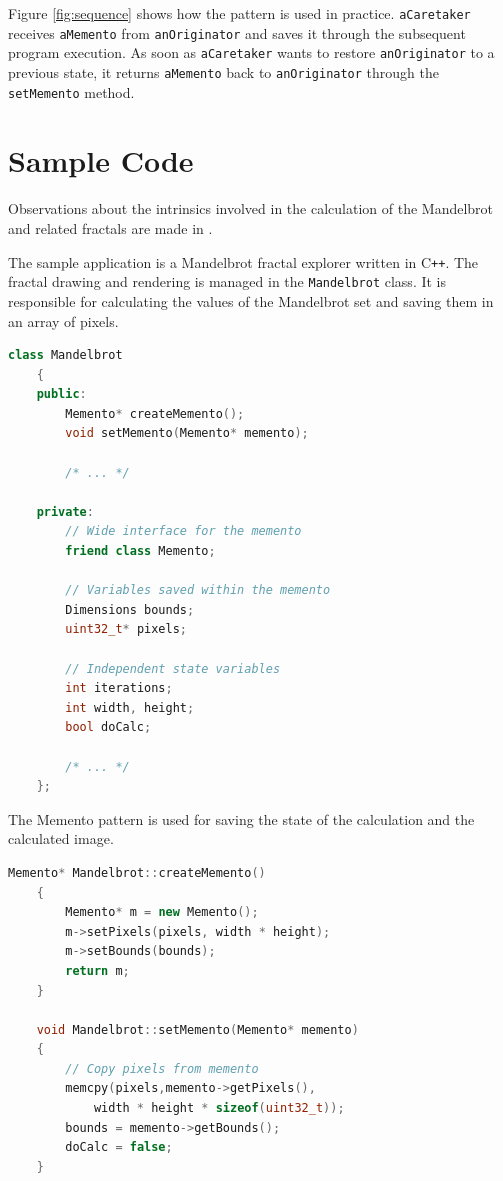 \documentclass[11pt, a4paper, twoside]{article}
\def\cpp{C{}\texttt{++}}
\begin{document}
	Figure \ref{fig:sequence} shows how the pattern is used in practice. \verb|aCaretaker| receives \verb|aMemento| from \verb|anOriginator| and saves it through the subsequent program execution. As soon as \verb|aCaretaker| wants to restore \verb|anOriginator| to a previous state, it returns \verb|aMemento| back to \verb|anOriginator| through the \verb|setMemento| method.
	
	
	\section{Sample Code}
	Observations about the intrinsics involved in the calculation of the Mandelbrot and related fractals are made in \cite{mandelbrot1980fractal}.
	
	The sample application is a Mandelbrot  fractal explorer written in \cpp. The fractal drawing and rendering is managed in the \verb|Mandelbrot| class. It is responsible for calculating the values of the Mandelbrot set and saving them in an array of pixels.
	
	\begin{lstlisting}[language=c++, caption={Mandelbrot.h}]
	class Mandelbrot
	{
	public:
		Memento* createMemento();
		void setMemento(Memento* memento);
		
		/* ... */
		
	private:
		// Wide interface for the memento
		friend class Memento;
		
		// Variables saved within the memento
		Dimensions bounds;
		uint32_t* pixels;
		
		// Independent state variables
		int iterations;
		int width, height;
		bool doCalc;
		
		/* ... */
	};
	\end{lstlisting}
	
	The Memento pattern is used for saving the state of the calculation and the calculated image.
	
	\begin{lstlisting}[language=c++, caption={Mandelbrot.cpp}]
	Memento* Mandelbrot::createMemento()
	{
		Memento* m = new Memento();
		m->setPixels(pixels, width * height);
		m->setBounds(bounds);
		return m;
	}
	
	void Mandelbrot::setMemento(Memento* memento)
	{
		// Copy pixels from memento
		memcpy(pixels,memento->getPixels(),
			width * height * sizeof(uint32_t));
		bounds = memento->getBounds();
		doCalc = false;
	}
	\end{lstlisting}
	
\end{document}
